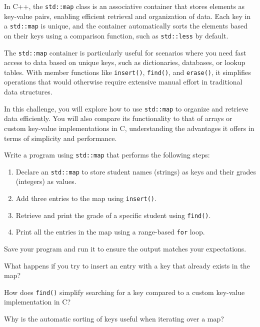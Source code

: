 \begin{challenge}
    \begin{chadescription}
    In C++, the \texttt{std::map} class is an associative container that stores elements as key-value pairs, enabling efficient retrieval and organization of data. 
    Each key in a \texttt{std::map} is unique, and the container automatically sorts the elements based on their keys using a comparison function, such as \texttt{std::less} by default.

    The \texttt{std::map} container is particularly useful for scenarios where you need fast access to data based on unique keys, such as dictionaries, databases, or lookup tables. 
    With member functions like \texttt{insert()}, \texttt{find()}, and \texttt{erase()}, it simplifies operations that would otherwise require extensive manual effort in traditional data structures. 

    In this challenge, you will explore how to use \texttt{std::map} to organize and retrieve data efficiently. 
    You will also compare its functionality to that of arrays or custom key-value implementations in C, understanding the advantages it offers in terms of simplicity and performance.
    \end{chadescription}

    \begin{task}
        Write a program using \texttt{std::map} that performs the following steps:
        \begin{enumerate}
            \item Declare an \texttt{std::map} to store student names (strings) as keys and their grades (integers) as values.
            \item Add three entries to the map using \texttt{insert()}.
            \item Retrieve and print the grade of a specific student using \texttt{find()}.
            \item Print all the entries in the map using a range-based \texttt{for} loop.
        \end{enumerate}

        Save your program and run it to ensure the output matches your expectations.

        \begin{questions}
            \item What happens if you try to insert an entry with a key that already exists in the map?
            \item How does \texttt{find()} simplify searching for a key compared to a custom key-value implementation in C?
            \item Why is the automatic sorting of keys useful when iterating over a map?
        \end{questions}
    \end{task}


\end{challenge}
